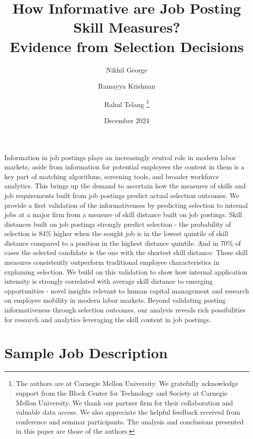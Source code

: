 \documentclass[letterpaper,11pt,leqno]{article}
\begin{document}
\title{How Informative are Job Posting Skill Measures? \\ Evidence from Selection Decisions}
\author{%
 Nikhil George \and Ramayya Krishnan \and Rahul Telang%
 \thanks{The authors are at Carnegie Mellon University. We gratefully acknowledge support from the Block Center for Technology and Society at Carnegie Mellon University. We thank our partner firm for their collaboration and valuable data access. We also appreciate the helpful feedback received from conference and seminar participants. The analysis and conclusions presented in this paper are those of the authors.}%
}
\date{December 2024}

\begin{titlepage}
\maketitle

Information in job postings plays an increasingly central role in modern labor markets; aside from information for 
potential employees the content in them is a key part of matching algorithms, screening tools, and broader workforce 
analytics. This brings up the demand to ascertain how the measures of skills and job requirements built from job postings 
predict actual selection outcomes. We provide a first validation of the informativeness by predicting selection to internal 
jobs at a major firm from a measure of skill distance built on job postings. Skill distances built on job postings 
strongly predict selection - the probability of selection is 84\% higher when the sought job is in the lowest quintile 
of skill distance compared to a position in the highest distance quintile. And in 70\% of cases the selected candidate 
is the one with the shortest skill distance. These skill measures consistently outperform traditional employee 
characteristics in explaining selection. We build on this validation to show how internal application intensity is 
strongly correlated with average skill distance to emerging opportunities - novel insights relevant to human capital 
management and research on employee mobility in modern labor markets. Beyond validating posting informativeness through 
selection outcomes, our analysis reveals rich possibilities for research and analytics leveraging the skill content 
in job postings.

\end{titlepage}











\appendix
\section{Sample Job Description}

\end{document}
